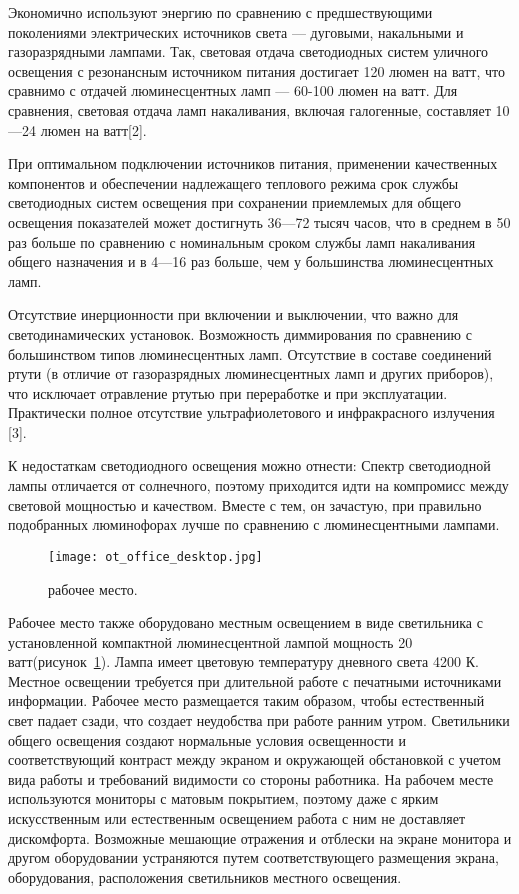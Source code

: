 Экономично используют энергию по сравнению с предшествующими поколениями электрических источников света --- дуговыми, накальными и газоразрядными лампами.
Так, световая отдача светодиодных систем уличного освещения с резонансным источником питания достигает 120 люмен на ватт, что сравнимо с отдачей люминесцентных ламп --- 60-100 люмен на ватт.
Для сравнения, световая отдача ламп накаливания, включая галогенные, составляет 10—24 люмен на ватт[2].

При оптимальном подключении источников питания, применении качественных компонентов и обеспечении надлежащего теплового режима срок службы светодиодных систем освещения при сохранении приемлемых для общего освещения показателей может достигнуть 36—72 тысяч часов, что в среднем в 50 раз больше по сравнению с номинальным сроком службы ламп накаливания общего назначения и в 4—16 раз больше, чем у большинства люминесцентных ламп.

Отсутствие инерционности при включении и выключении, что важно для светодинамических установок.
Возможность диммирования по сравнению с большинством типов люминесцентных ламп.
Отсутствие в составе соединений ртути (в отличие от газоразрядных люминесцентных ламп и других приборов), что исключает отравление ртутью при переработке и при эксплуатации.
Практически полное отсутствие ультрафиолетового и инфракрасного излучения [3].

К недостаткам светодиодного освещения можно отнести: Спектр светодиодной лампы отличается от солнечного, поэтому приходится идти на компромисс между световой мощностью и качеством. Вместе с тем, он зачастую, при правильно подобранных люминофорах лучше по сравнению с люминесцентными лампами.

\begin{figure}[ht]
\centering
  \texttt{[image: ot\_office\_desktop.jpg]}
  \caption{ рабочее место. }
  \label{fig:office_desktop}
\end{figure}

Рабочее место также оборудовано местным освещением в виде светильника с установленной компактной люминесцентной лампой мощность 20 ватт(рисунок~\ref{fig:office_desktop}).
Лампа имеет цветовую температуру дневного света 4200 К.
Местное освещении требуется при длительной работе с печатными источниками информации.
Рабочее место размещается таким образом, чтобы естественный свет падает сзади, что создает неудобства при работе ранним утром.
Светильники общего освещения создают нормальные условия освещенности и соответствующий контраст между экраном и окружающей обстановкой с учетом вида работы и требований видимости со стороны работника.
На рабочем месте используются мониторы с матовым покрытием, поэтому даже с ярким искусственным или естественным освещением работа с ним не доставляет дискомфорта.
Возможные мешающие отражения и отблески на экране монитора и другом оборудовании устраняются путем соответствующего размещения экрана, оборудования, расположения светильников местного освещения.

